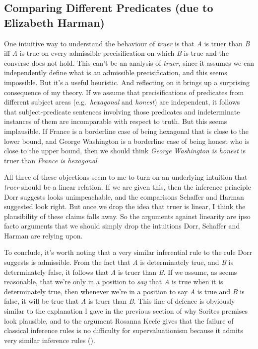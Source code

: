 \documentclass[
  10pt,
  letterpaper,
  DIV=11,
  numbers=noendperiod,
  twoside]{scrartcl}
\begin{document}
\subsection*{Comparing Different Predicates (due to Elizabeth
Harman)}\label{comparing-different-predicates-due-to-elizabeth-harman}

One intuitive way to understand the behaviour of \emph{truer} is that
\emph{A} is truer than \emph{B} iff \emph{A} is true on every admissible
precisification on which \emph{B} is true and the converse does not
hold. This can't be an analysis of \emph{truer}, since it assumes we can
independently define what is an admissible precisification, and this
seems impossible. But it's a useful heuristic. And reflecting on it
brings up a surprising consequence of my theory. If we assume that
precisifications of predicates from different subject areas
(e.g.~\emph{hexagonal} and \emph{honest}) are independent, it follows
that subject-predicate sentences involving those predicates and
indeterminate instances of them are incomparable with respect to truth.
But this seems implausible. If France is a borderline case of being
hexagonal that is close to the lower bound, and George Washington is a
borderline case of being honest who is close to the upper bound, then we
should think \emph{George Washington is honest} is truer than
\emph{France is hexagonal}.

All three of these objections seem to me to turn on an underlying
intuition that \emph{truer} should be a linear relation. If we are given
this, then the inference principle Dorr suggests looks unimpeachable,
and the comparisons Schaffer and Harman suggested look right. But once
we drop the idea that truer is linear, I think the plausibility of these
claims falls away. So the arguments against linearity are ipso facto
arguments that we should simply drop the intuitions Dorr, Schaffer and
Harman are relying upon.

To conclude, it's worth noting that a very similar inferential rule to
the rule Dorr suggests is admissible. From the fact that \emph{A} is
determinately true, and \emph{B} is determinately false, it follows that
\emph{A} is truer than \emph{B}. If we assume, as seems reasonable, that
we're only in a position to \emph{say} that \emph{A} is true when it is
determinately true, then whenever we're in a position to say \emph{A} is
true and \emph{B} is false, it will be true that \emph{A} is truer than
\emph{B}. This line of defence is obviously similar to the explanation I
gave in the previous section of why Sorites premises look plausible, and
to the argument Rosanna Keefe gives that the failure of classical
inference rules is no difficulty for supervaluationism because it admits
very similar inference rules ().
\end{document}
